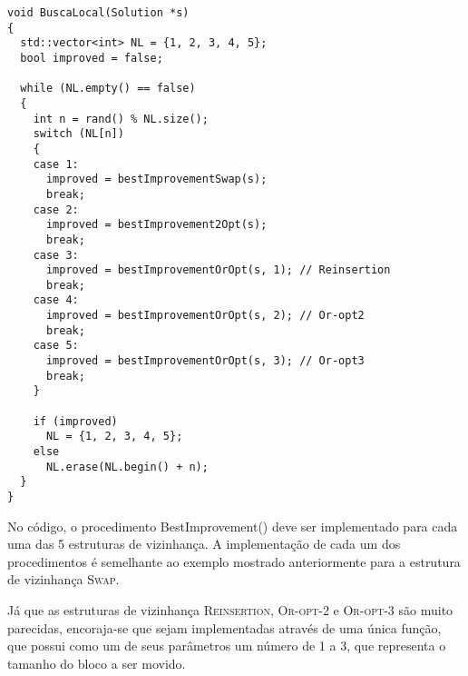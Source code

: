 \begin{lstlisting}[style=cplusplusListStyle]
void BuscaLocal(Solution *s)
{
  std::vector<int> NL = {1, 2, 3, 4, 5};
  bool improved = false;

  while (NL.empty() == false)
  {
    int n = rand() % NL.size();
    switch (NL[n])
    {
    case 1:
      improved = bestImprovementSwap(s);
      break;
    case 2:
      improved = bestImprovement2Opt(s);
      break;
    case 3:
      improved = bestImprovementOrOpt(s, 1); // Reinsertion
      break;
    case 4:
      improved = bestImprovementOrOpt(s, 2); // Or-opt2
      break;
    case 5:
      improved = bestImprovementOrOpt(s, 3); // Or-opt3
      break;
    }

    if (improved)
      NL = {1, 2, 3, 4, 5};
    else
      NL.erase(NL.begin() + n);
  }
}
\end{lstlisting}

\iffalse
\begin{enumerate}
    \item \(s' \gets s\);
    \item \(NL \gets \{\mathcal{N}_1,\dots,\mathcal{N}_5\}\); \label{buscalocalprimeiropasso}
    \item \(\mathcal{N}_\eta \gets \text{elemento aleatório de } NL\); \label{buscalocalsegundopasso}
    \item \(s_{temp} \gets s', \text{BestImprovement}(s', \mathcal{N}_\eta)\);
    \item Se \(f(s') < f(s_{temp})\), voltar para o passo \ref{buscalocalprimeiropasso};
    \item \(NL \gets NL \setminus \mathcal{N}_\eta\);
    \item Se \(NL = \emptyset\), retornar \(s'\). Caso contrário, voltar para o passo \ref{buscalocalsegundopasso}.
\end{enumerate}
\fi

No código, o procedimento BestImprovement() deve ser implementado para cada uma das 5 estruturas de vizinhança. A implementação de cada um dos procedimentos é semelhante ao exemplo mostrado anteriormente para a estrutura de vizinhança \textsc{Swap}.

 Já que as estruturas de vizinhança \textsc{Reinsertion}, \textsc{Or-opt-2} e \textsc{Or-opt-3} são muito parecidas, encoraja-se que sejam implementadas através de uma única função, que possui como um de seus parâmetros um número de 1 a 3, que representa o tamanho do bloco a ser movido.

